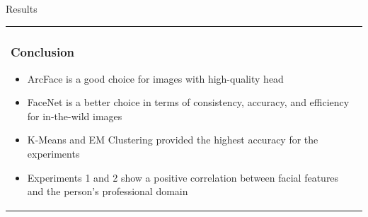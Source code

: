 \documentclass[11pt]{beamer}
\begin{document}
\begin{frame}{Results}
\begin{tabular}{l}
\parbox{1\linewidth}{
\frametitle{Conclusion}
\begin{itemize}
\item ArcFace is a good choice for images with high-quality head \item FaceNet is a better choice in terms of consistency, accuracy, and efficiency for in-the-wild images
\item K-Means and EM Clustering provided the highest accuracy for the experiments
\item Experiments 1 and 2 show a positive correlation between facial features and the person's professional domain
\end{itemize}

}
\end{tabular}  
\end{frame}



\printbibliography
\end{document}
